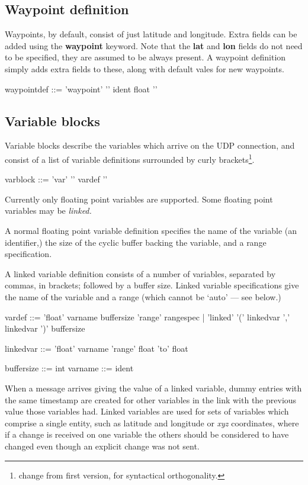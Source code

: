 \subsection{Waypoint definition}
\label{waypointdef}
Waypoints, by default, consist of just latitude and longitude. Extra
fields can be added using the \textbf{waypoint} keyword. Note that
the \textbf{lat} and \textbf{lon} fields do not need to be specified,
they are assumed to be always present. A waypoint definition simply adds
extra fields to these, along with default vales for new waypoints.
\begin{v}
waypointdef ::= 'waypoint' '{' {ident float} '}'
\end{v}


\subsection{Variable blocks}
Variable blocks describe the variables which arrive on the UDP
connection, and consist of a list of variable definitions surrounded
by curly brackets\footnote{change from first version, for syntactical orthogonality.}.
\begin{v}
varblock    ::= 'var' '{' {vardef} '}'
\end{v}
Currently only floating point variables are supported.
Some floating point variables may be \emph{linked.}

A normal floating point variable definition specifies the name of the variable
(an identifier,) the size of the cyclic buffer backing the variable,
and a range specification.

A linked variable definition consists of a number of variables,
separated by commas, in brackets; followed by a buffer size.
Linked variable specifications give the name of the variable and
a range (which cannot be `auto' --- see below.)
\begin{v}
vardef      ::= 'float' varname buffersize 'range' rangespec
            |   'linked' '(' { linkedvar ',' } linkedvar ')' buffersize

linkedvar   ::= 'float' varname 'range' float 'to' float

buffersize  ::= int
varname     ::= ident
            
\end{v}
When a message arrives giving the value of a linked variable, dummy
entries with the same timestamp are created for other variables
in the link with the previous value those variables had. Linked
variables are used for sets of variables which comprise a single
entity, such as latitude and longitude or \emph{xyz} coordinates,
where if a change is received on one variable the others should be
considered to have changed even though an explicit change was not
sent.

